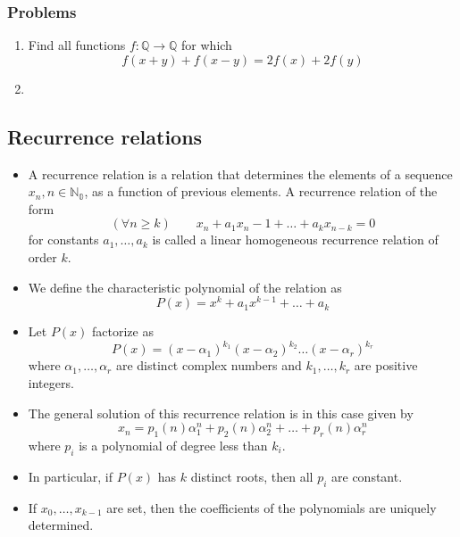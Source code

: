 \documentclass{article}
\begin{document}
		\subsubsection*{Problems}
			\begin{enumerate}[resume]
				\item Find all functions $f: \mathbb{Q} \to \mathbb{Q}$ for which
				$$f(x+y) + f(x-y) = 2f(x) + 2f(y) $$
				\item 
				
			\end{enumerate}

	\subsection{Recurrence relations}
		\begin{itemize}
			\item 
			A recurrence relation is a relation that determines the elements of a sequence $x_n, n \in \mathbb{N_0}$, as a function of previous elements. A recurrence relation of the form
			$$(\forall n \geq k) \hspace{2em} x_n + a_1x_n-1 + \hdots + a_kx_{n-k} = 0$$
			for constants $a_1, \hdots, a_k$ is called a linear homogeneous recurrence relation of order $k$.
			\item
			We define the characteristic polynomial of the relation as 
			$$P(x) = x^k + a_1x^{k-1} + \hdots + a_k$$
			\item
			Let $P(x)$	factorize as 
			$$P(x) = (x-\alpha_1)^{k_1}(x-\alpha_2)^{k_2} \hdots (x-\alpha_r)^{k_r}$$
			where $\alpha_1, \hdots , \alpha_r$ are distinct complex numbers and $k_1, \hdots, k_r$ are positive integers. 
			\item 
			The general solution of this recurrence relation is in this case given by
			$$x_n = p_1(n)\alpha_1^n + p_2(n)\alpha_2^n + \hdots + p_r(n)\alpha_r^n$$
			where $p_i$ is a polynomial of degree less than $k_i$.
			\item
			In particular, if $P(x)$ has $k$
			distinct roots, then all $p_i$ are constant.
			\item 
			If $x_0, \hdots, x_{k-1}$ are set, then the coefficients of the polynomials are uniquely determined.
		\end{itemize}
			
\end{document}
